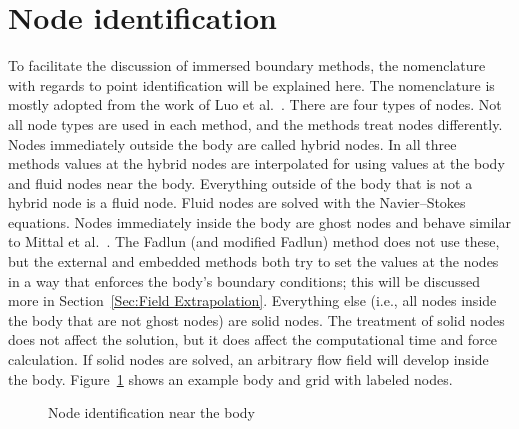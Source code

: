 \section{Node identification}
To facilitate the discussion of immersed boundary methods, the nomenclature with regards to point identification will be explained here. 
The nomenclature is mostly adopted from the work of Luo et al.~\cite{Luo:2012gx}. 
There are four types of nodes. 
Not all node types are used in each method, and the methods treat nodes differently. 
Nodes immediately outside the body are called hybrid nodes. 
In all three methods values at the hybrid nodes are interpolated for using values at the body and fluid nodes near the body. 
Everything outside of the body that is not a hybrid node is a fluid node. 
Fluid nodes are solved with the Navier--Stokes equations. 
Nodes immediately inside the body are ghost nodes and behave similar to Mittal et al.~\cite{Mittal:2005ii}. 
The Fadlun (and modified Fadlun) method does not use these, but the external and embedded methods both try to set the values at the nodes in a way that enforces the body's boundary conditions; this will be discussed more in Section~\ref{Sec:Field Extrapolation}. 
Everything else (i.e., all nodes inside the body that are not ghost nodes) are solid nodes. 
The treatment of solid nodes does not affect the solution, but it does affect the computational time and force calculation. 
If solid nodes are solved, an arbitrary flow field will develop inside the body. 
Figure~\ref{fig:node id} shows an example body and grid with labeled nodes. 

\begin{figure}[!htb]
	\centering
	
	\caption{Node identification near the body}
	\label{fig:node id}
\end{figure}

